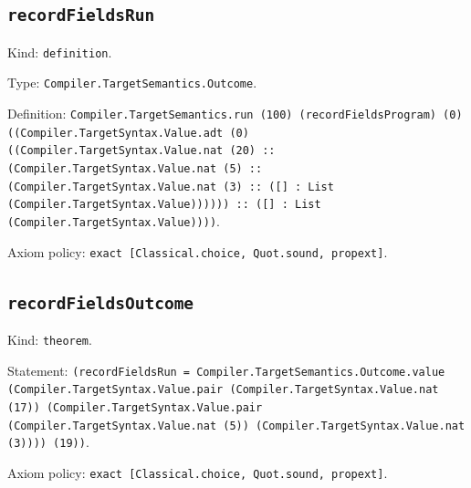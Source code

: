 \documentclass[11pt]{article}
\begin{document}
\subsection*{\texttt{recordFieldsRun}}
\noindent Kind: \texttt{definition}.\par
\noindent Type: \texttt{Compiler.TargetSemantics.Outcome}.\par
\noindent Definition: \texttt{Compiler.TargetSemantics.run (100) (recordFieldsProgram) (0) ((Compiler.TargetSyntax.Value.adt (0) ((Compiler.TargetSyntax.Value.nat (20) :: (Compiler.TargetSyntax.Value.nat (5) :: (Compiler.TargetSyntax.Value.nat (3) :: ([] : List (Compiler.TargetSyntax.Value)))))) :: ([] : List (Compiler.TargetSyntax.Value))))}.\par
\noindent Axiom policy: \texttt{exact [Classical.choice, Quot.sound, propext]}.\par
\subsection*{\texttt{recordFieldsOutcome}}
\noindent Kind: \texttt{theorem}.\par
\noindent Statement: \texttt{(recordFieldsRun = Compiler.TargetSemantics.Outcome.value (Compiler.TargetSyntax.Value.pair (Compiler.TargetSyntax.Value.nat (17)) (Compiler.TargetSyntax.Value.pair (Compiler.TargetSyntax.Value.nat (5)) (Compiler.TargetSyntax.Value.nat (3)))) (19))}.\par
\noindent Axiom policy: \texttt{exact [Classical.choice, Quot.sound, propext]}.\par
\end{document}

